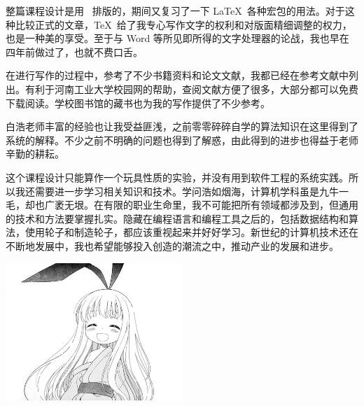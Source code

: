 整篇课程设计是用 \LaTeXe\ 排版的，期间又复习了一下 \LaTeX\ 各种宏包的用法。对于这种比较正式的文章，\TeX\ 给了我专心写作文字的权利和对版面精细调整的权力，也是一种美的享受。至于与 Word 等所见即所得的文字处理器的论战，我也早在四年前做过了，也就不费口舌。

在进行写作的过程中，参考了不少书籍资料和论文文献，我都已经在参考文献中列出。有利于河南工业大学校园网的帮助，查阅文献方便了很多，大部分都可以免费下载阅读。学校图书馆的藏书也为我的写作提供了不少参考。

白浩老师丰富的经验也让我受益匪浅，之前零零碎碎自学的算法知识在这里得到了系统的解释。不少之前不明确的问题也得到了解惑，由此得到的进步也得益于老师辛勤的耕耘。

这个课程设计只能算作一个玩具性质的实验，并没有用到软件工程的系统实践。所以我还需要进一步学习相关知识和技术。学问浩如烟海，计算机学科虽是九牛一毛，却也广袤无垠。在有限的职业生命里，我不可能把所有领域都涉及到，但通用的技术和方法要掌握扎实。隐藏在编程语言和编程工具之后的，包括数据结构和算法，使用轮子和制造轮子，都应该重视起来并好好学习。新世纪的计算机技术还在不断地发展中，我也希望能够投入创造的潮流之中，推动产业的发展和进步。

\vfill
\centering
\includegraphics[width=0.5\textwidth]{image/166.png}
\vfill
